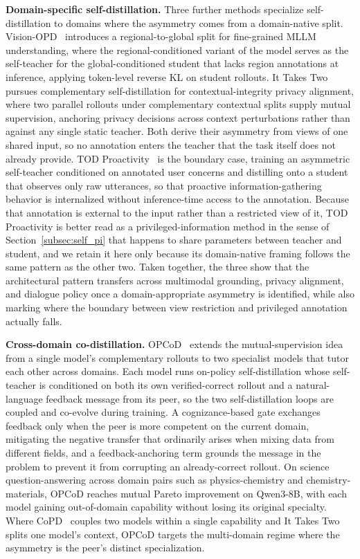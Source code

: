 \documentclass{article} %
\begin{document}
\textbf{Domain-specific self-distillation.} Three further methods specialize self-distillation to domains where the asymmetry comes from a domain-native split. Vision-OPD~\citep{2605.18740} introduces a regional-to-global split for fine-grained MLLM understanding, where the regional-conditioned variant of the model serves as the self-teacher for the global-conditioned student that lacks region annotations at inference, applying token-level reverse KL on student rollouts. It Takes Two~\citep{2605.20258} pursues complementary self-distillation for contextual-integrity privacy alignment, where two parallel rollouts under complementary contextual splits supply mutual supervision, anchoring privacy decisions across context perturbations rather than against any single static teacher. Both derive their asymmetry from views of one shared input, so no annotation enters the teacher that the task itself does not already provide. TOD Proactivity~\citep{2605.22240} is the boundary case, training an asymmetric self-teacher conditioned on annotated user concerns and distilling onto a student that observes only raw utterances, so that proactive information-gathering behavior is internalized without inference-time access to the annotation. Because that annotation is external to the input rather than a restricted view of it, TOD Proactivity is better read as a privileged-information method in the sense of Section~\ref{subsec:self_pi} that happens to share parameters between teacher and student, and we retain it here only because its domain-native framing follows the same pattern as the other two. Taken together, the three show that the architectural pattern transfers across multimodal grounding, privacy alignment, and dialogue policy once a domain-appropriate asymmetry is identified, while also marking where the boundary between view restriction and privileged annotation actually falls.

\textbf{Cross-domain co-distillation.} OPCoD~\citep{2606.14368} extends the mutual-supervision idea from a single model's complementary rollouts to two specialist models that tutor each other across domains. Each model runs on-policy self-distillation whose self-teacher is conditioned on both its own verified-correct rollout and a natural-language feedback message from its peer, so the two self-distillation loops are coupled and co-evolve during training. A cognizance-based gate exchanges feedback only when the peer is more competent on the current domain, mitigating the negative transfer that ordinarily arises when mixing data from different fields, and a feedback-anchoring term grounds the message in the problem to prevent it from corrupting an already-correct rollout. On science question-answering across domain pairs such as physics-chemistry and chemistry-materials, OPCoD reaches mutual Pareto improvement on Qwen3-8B, with each model gaining out-of-domain capability without losing its original specialty. Where CoPD~\citep{2604.27083} couples two models within a single capability and It Takes Two splits one model's context, OPCoD targets the multi-domain regime where the asymmetry is the peer's distinct specialization.
\end{document}
